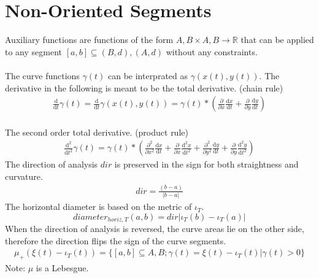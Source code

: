 \documentclass{report}
\begin{document}
\section{Non-Oriented Segments}
Auxiliary functions are functions of the form $A,B \times A,B \rightarrow \mathbb{R}$ that can be applied to any segment $[a,b] \subseteq (B,d),(A,d)$ without any constraints.\\\\
The curve functions $ \gamma (t)$ can be interprated as $\gamma(x(t),y(t))$. The derivative in the following is meant to be the total derivative. (chain rule)
\begin{align}
\frac{\mathrm{d}}{\mathrm{d} t} \gamma (t) = \frac{\mathrm{d}}{\mathrm{d} t} \gamma (x(t),y(t)) = \gamma(t)* (\frac{\partial}{\partial x}  \frac{\mathrm{d} x}{\mathrm{d}t} + \frac{\partial}{\partial y} \frac{\mathrm{d} y}{\mathrm{d}t})
\end{align}\\
The second order total derivative. (product rule)
\begin{align}
\frac{\mathrm{d}^2}{\mathrm{d}t^2}\gamma(t)= \gamma(t)* (\frac{\partial^2}{\partial x^2}\frac{\mathrm{d}x}{\mathrm{d}t} + \frac{\partial}{\partial x}\frac{\mathrm{d}^2x}{\mathrm{d}t^2} + \frac{\partial^2}{\partial y^2}\frac{\mathrm{d}y}{\mathrm{d}t} + \frac{\partial}{\partial y}\frac{\mathrm{d}^2y}{\mathrm{d}t^2})
\end{align}
The direction of analysis $dir$ is preserved in the sign for both straightness and curvature.
\begin{align}
dir = \frac{(b-a)}{\lvert b-a \rvert}
\end{align}
The horizontal diameter is based on the metric of $\iota_{T}$.
\begin{equation}
diameter_{horiz,T}(a,b)= dir \lvert \iota_{T}(b) - \iota_{T}(a) \rvert
\end{equation}
When the direction of analysis is reversed, the curve areas lie on the other side, therefore the direction flips the sign of the curve segments.
\begin{align}
\mu_{+}(\xi(t) -\iota_{T}(t))=\{[a,b] \subseteq A,B; \gamma(t)=\xi(t) -\iota_{T}(t) \vert \gamma(t)>0\}
\end{align}
Note: $\mu$ is a Lebesgue.
\end{document}
